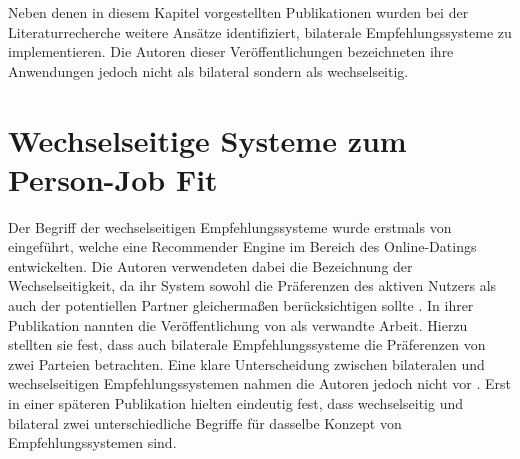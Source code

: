 Neben denen in diesem Kapitel vorgestellten Publikationen wurden bei der Literaturrecherche weitere Ansätze identifiziert, bilaterale Empfehlungssysteme zu implementieren. Die Autoren dieser Veröffentlichungen bezeichneten ihre Anwendungen jedoch nicht als bilateral sondern als wechselseitig. %

\section{Wechselseitige Systeme zum Person-Job Fit}
\label{ch:verwandteArbeiten:nichtAufDemPEFitBasierendeBilateraleSysteme}
Der Begriff der wechselseitigen Empfehlungssysteme wurde erstmals von \textcite[S. 1]{pizzato:2010} eingeführt, welche eine Recommender Engine im Bereich des Online-Datings entwickelten. Die Autoren verwendeten dabei die Bezeichnung der Wechselseitigkeit, da ihr System sowohl die Präferenzen des aktiven Nutzers als auch der potentiellen Partner gleichermaßen berücksichtigen sollte \cite[S. 1]{pizzato:2010}. In ihrer Publikation nannten \textcite[S. 3]{pizzato:2010} die Veröffentlichung von \textcite[S. 1ff.]{malinowski:2006} als verwandte Arbeit. Hierzu stellten sie fest, dass auch bilaterale Empfehlungssysteme die Präferenzen von zwei Parteien betrachten. Eine klare Unterscheidung zwischen bilateralen und wechselseitigen Empfehlungssystemen nahmen die Autoren jedoch nicht vor \cite[S. 3]{pizzato:2010}. Erst in einer späteren Publikation hielten \textcite[S. 8]{pizzato:2013} eindeutig fest, dass wechselseitig und bilateral zwei unterschiedliche Begriffe für dasselbe Konzept von Empfehlungssystemen sind.

